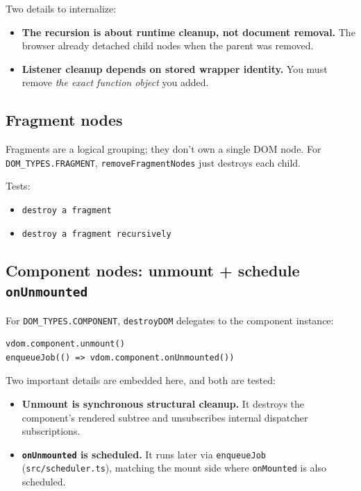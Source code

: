 Two details to internalize:

\begin{itemize}
  \item \textbf{The recursion is about runtime cleanup, not document removal.} The browser already detached child nodes when the parent was removed.
  \item \textbf{Listener cleanup depends on stored wrapper identity.} You must remove \emph{the exact function object} you added.
\end{itemize}

\subsection{Fragment nodes}

Fragments are a logical grouping; they don't own a single DOM node. For \texttt{DOM\_TYPES.FRAGMENT}, \texttt{removeFragmentNodes} just destroys each child.

Tests:

\begin{itemize}
  \item \texttt{destroy a fragment}
  \item \texttt{destroy a fragment recursively}
\end{itemize}

\subsection{Component nodes: unmount + schedule \texttt{onUnmounted}}

For \texttt{DOM\_TYPES.COMPONENT}, \texttt{destroyDOM} delegates to the component instance:

\begin{verbatim}
vdom.component.unmount()
enqueueJob(() => vdom.component.onUnmounted())
\end{verbatim}

Two important details are embedded here, and both are tested:

\begin{itemize}
  \item \textbf{Unmount is synchronous structural cleanup.} It destroys the component's rendered subtree and unsubscribes internal dispatcher subscriptions.
  \item \textbf{\texttt{onUnmounted} is scheduled.} It runs later via \texttt{enqueueJob} (\texttt{src/scheduler.ts}), matching the mount side where \texttt{onMounted} is also scheduled.
\end{itemize}

